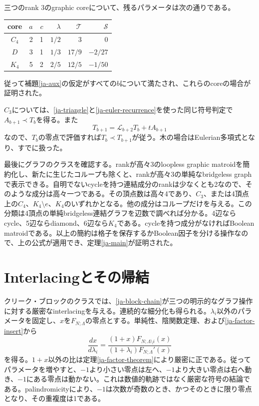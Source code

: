 \documentclass[12pt]{amsart}
\theoremstyle{definition}
\theoremstyle{remark}
\numberwithin{equation}{section}
\newcommand{\Dop}[1]{\mathscr{L}_{#1}}
\begin{document}
\begin{samepage}
三つのrank 3のgraphic coreについて、残るパラメータは次の通りである。
\begin{center}
\begin{tabular}{c|rrrrr}
core&$a$&$c$&$\lambda$&$\mathcal T$&$\mathcal S$\\\hline
$C_4$&2&1&$1/2$&3&0\\
$D$&3&1&$1/3$&$17/9$&$-2/27$\\
$K_4$&5&2&$2/5$&$12/5$&$-1/50$
\end{tabular}
\end{center}
\end{samepage}
従って補題\ref{ja-aux}の仮定がすべての$b$について満たされ、これらのcoreの場合が証明された。

$C_3$については、\eqref{ja-triangle}と\eqref{ja-euler-recurrence}を使った同じ符号判定で$A_{b+1}\prec T_b$を得る。また
\[
 T_{b+1}=\Dop{b+2}T_b+tA_{b+1}
\]
なので、$T_b$の零点で評価すれば$T_b\prec T_{b+1}$が従う。木の場合はEulerian多項式となり、すでに扱った。

最後にグラフのクラスを確認する。rankが高々3のloopless graphic matroidを簡約化し、新たに生じたコループも除くと、rankが高々3の単純なbridgeless graphで表示できる。自明でないcycleを持つ連結成分のrankは少なくとも2なので、そのような成分は高々一つである。その頂点数は高々4であり、$C_3$、または4頂点上の$C_4$、$K_4\setminus e$、$K_4$のいずれかとなる。他の成分はコループだけを与える。この分類は4頂点の単純bridgeless連結グラフを辺数で調べれば分かる。4辺ならcycle、5辺ならdiamond、6辺なら$K_4$である。cycleを持つ成分がなければBoolean matroidである。以上の簡約は格子を保存するかBoolean因子を分ける操作なので、上の公式が適用でき、定理\ref{ja-main}が証明された。

\section{Interlacingとその帰結}

クリーク・ブロックのクラスでは、\eqref{ja-block-chain}が三つの明示的なグラフ操作に対する厳密なinterlacingを与える。連続的な細分化も得られる。$\lambda_i$以外のパラメータを固定し、$x$を$F_{N;\Lambda}$の零点とする。単純性、陰関数定理、および\eqref{ja-factor-insert}から
\begin{equation}\label{ja-factor-motion}
 \frac{dx}{d\lambda_i}
 =\frac{(1+x)F_{N;\Lambda\setminus i}(x)}
        {(1+\lambda_i)F_{N;\Lambda}'(x)}
\end{equation}
を得る。$1+x$以外の比は定理\ref{ja-factor-theorem}により厳密に正である。従ってパラメータを増やすと、$-1$より小さい零点は左へ、$-1$より大きい零点は右へ動き、$-1$にある零点は動かない。これは数値的軌跡ではなく厳密な符号の結論である。palindromicityにより、$-1$は次数が奇数のとき、かつそのときに限り零点となり、その重複度は1である。
\end{document}
